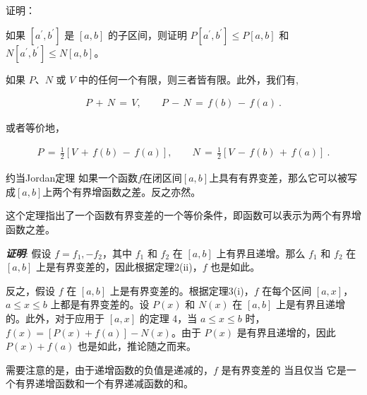 \begin{example}{证明：}

\end{example}

\begin{example}{如果 $[a^{\prime},b^{\prime}]$ 是 $[a,b]$ 的子区间，则证明 $P[a^{\prime},b^{\prime}]\leq P[a,b]$ 和 $N[a^{\prime},b^{\prime}]\leq N[a,b]$。}

\end{example}

\begin{theorem}{}
如果 $P$、$N$ 或 $V$ 中的任何一个有限，则三者皆有限。此外，我们有,

\begin{align}
 P\,+\,N\,=\,V,\qquad P\,-\,N\,=\,f(b)\,-\,f(a)~.
\end{align}

或者等价地，

\begin{align}
 P\,=\,\frac{1}{2}[V\,+\,f(b)\,-\,f(a)],\qquad N\,=\,\frac{1}{2}[V\,-\,f(b)\,+\,f(a)]~.
\end{align}
\end{theorem}

\begin{corollary}{约当Jordan定理}
如果一个函数$f$在闭区间$[a,b]$上具有有界变差，那么它可以被写成$[a,b]$上两个有界增函数之差。反之亦然。
\end{corollary}

这个定理指出了一个函数有界变差的一个等价条件，即函数可以表示为两个有界增函数之差。

\textbf{\textsl{证明}}: 假设 $f=f_{1},-f_{2}$，其中 $f_{1}$ 和 $f_{2}$ 在 $[a,b]$ 上有界且递增。那么 $f_{1}$ 和 $f_{2}$ 在 $[a,b]$ 上是有界变差的，因此根据定理2(ii)，$f$ 也是如此。

反之，假设 $f$ 在 $[a,b]$ 上是有界变差的。根据定理3(i)，$f$ 在每个区间 $[a,x]$，$a\leq x\leq b$ 上都是有界变差的。设 $P(x)$ 和 $N(x)$ 在 $[a,b]$ 上是有界且递增的。此外，对于应用于 $[a,x]$ 的定理 4，当 $a\leq x\leq b$ 时，$f(x)=[P(x)+f(a)]-N(x)$。由于 $P(x)$ 是有界且递增的，因此 $P(x)+f(a)$ 也是如此，推论随之而来。

需要注意的是，由于递增函数的负值是递减的，$f$ 是有界变差的 当且仅当 它是一个有界递增函数和一个有界递减函数的和。

